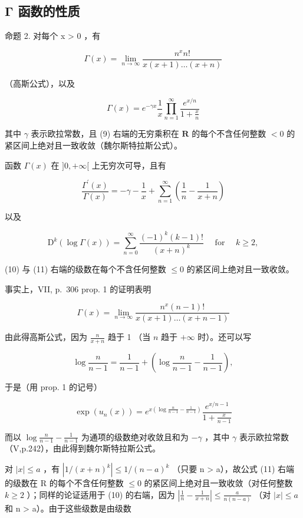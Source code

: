 \subsection{Γ 函数的性质}

命题 2. 对每个 x \textgreater{} 0 ，有

\[
\Gamma (x) = \lim _ {n \rightarrow \infty} \frac {n ^ {x} n !}{x (x + 1) \dots (x + n)}\tag{8}
\]

（高斯公式），以及

\[
\Gamma (x) = e ^ {- \gamma x} \frac {1}{x} \prod_ {n = 1} ^ {\infty} \frac {e ^ {x / n}}{1 + \frac {x}{n}}\tag{9}
\]

其中 \(\gamma\) 表示欧拉常数，且 (9) 右端的无穷乘积在 \(\mathbf{R}\) 的每个不含任何整数 \(< 0\) 的紧区间上绝对且一致收敛（魏尔斯特拉斯公式）。

函数 \(\Gamma(x)\) 在 \(]0, +\infty[\) 上无穷次可导，且有

\[
{\frac {\Gamma^ {\prime} (x)}{\Gamma (x)}} = - \gamma - {\frac {1}{x}} + \sum_ {n = 1} ^ {\infty} \left({\frac {1}{n}} - {\frac {1}{x + n}}\right)\tag{10}
\]

以及

\[
\mathrm{D} ^ {k} (\log \Gamma (x)) = \sum_ {n = 0} ^ {\infty} \frac {(- 1) ^ {k} (k - 1) !}{(x + n) ^ {k}} \quad \text { for } \quad k \geqslant 2,\tag{11}
\]

(10) 与 (11) 右端的级数在每个不含任何整数 \(\leqslant 0\) 的紧区间上绝对且一致收敛。

事实上，VII, p.~306 prop. 1 的证明表明

\[
\Gamma (x) = \lim _ {n \rightarrow \infty} \frac {n ^ {x} (n - 1) !}{x (x + 1) \dots (x + n - 1)}
\]

由此得高斯公式，因为 \(\frac{n}{x + n}\) 趋于 1 （当 \(n\) 趋于 \(+\infty\) 时）。还可以写

\[
\log \frac {n}{n - 1} = \frac {1}{n - 1} + \left(\log \frac {n}{n - 1} - \frac {1}{n - 1}\right),
\]

于是（用 prop. 1 的记号）

\[
\exp (u _ {n} (x)) = e ^ {x \left(\log \frac {n}{n - 1} - \frac {1}{n - 1}\right)} \frac {e ^ {x / n - 1}}{1 + \frac {x}{n - 1}}
\]

而以 \(\log \frac{n}{n - 1} -\frac{1}{n - 1}\) 为通项的级数绝对收敛且和为 \(-\gamma\) ，其中 \(\gamma\) 表示欧拉常数（V,p.242），由此得到魏尔斯特拉斯公式。

对 \(|x| \leqslant a\) ，有 \(\left|1/(x+n)^{k}\right| \leqslant 1/(n-a)^{k}\) （只要 n \textgreater{} a），故公式 (11) 右端的级数在 R 的每个不含任何整数 \(\leqslant 0\) 的紧区间上绝对且一致收敛（对任何整数 \(k \geqslant 2\) ）；同样的论证适用于 (10) 的右端，因为 \(\left|\frac{1}{n}-\frac{1}{x+n}\right| \leqslant \frac{a}{n(n-a)}\) （对 \(|x| \leqslant a\) 和 n \textgreater{} a）。由于这些级数是由级数

